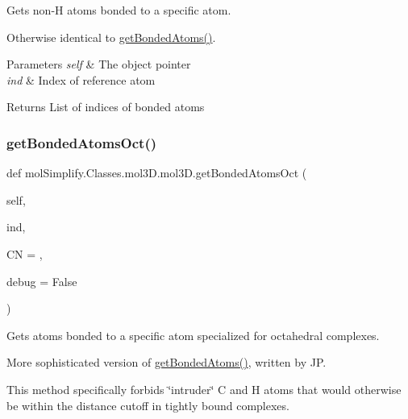 Gets non-\/H atoms bonded to a specific atom. 

Otherwise identical to \hyperlink{classmolSimplify_1_1Classes_1_1mol3D_1_1mol3D_a394c680ec3eddbcc22ebcec76d211218}{get\+Bonded\+Atoms()}. 
\begin{DoxyParams}{Parameters}
{\em self} & The object pointer \\
\hline
{\em ind} & Index of reference atom \\
\hline
\end{DoxyParams}
\begin{DoxyReturn}{Returns}
List of indices of bonded atoms 
\end{DoxyReturn}
\mbox{\label{classmolSimplify_1_1Classes_1_1mol3D_1_1mol3D_a054076c86f015de56353017cc391ba4c}} 
\subsubsection{\texorpdfstring{get\+Bonded\+Atoms\+Oct()}{getBondedAtomsOct()}}
{\footnotesize\ttfamily def mol\+Simplify.\+Classes.\+mol3\+D.\+mol3\+D.\+get\+Bonded\+Atoms\+Oct (\begin{DoxyParamCaption}\item[{}]{self,  }\item[{}]{ind,  }\item[{}]{CN = {},  }\item[{}]{debug = {\ttfamily False} }\end{DoxyParamCaption})}



Gets atoms bonded to a specific atom specialized for octahedral complexes. 

More sophisticated version of \hyperlink{classmolSimplify_1_1Classes_1_1mol3D_1_1mol3D_a394c680ec3eddbcc22ebcec76d211218}{get\+Bonded\+Atoms()}, written by JP.

This method specifically forbids \char`\"{}intruder\char`\"{} C and H atoms that would otherwise be within the distance cutoff in tightly bound complexes.

